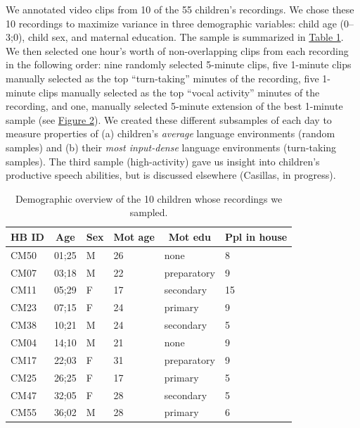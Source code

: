 \documentclass[floatsintext,man]{apa6}
\theoremstyle{definition}
\theoremstyle{definition}
\theoremstyle{definition}
\theoremstyle{remark}
\begin{document}
We annotated video clips from 10 of the 55 children's recordings. We
chose these 10 recordings to maximize variance in three demographic
variables: child age (0--3;0), child sex, and maternal education. The
sample is summarized in \protect\hyperlink{tab1}{Table 1}. We then
selected one hour's worth of non-overlapping clips from each recording
in the following order: nine randomly selected 5-minute clips, five
1-minute clips manually selected as the top \enquote{turn-taking}
minutes of the recording, five 1-minute clips manually selected as the
top \enquote{vocal activity} minutes of the recording, and one, manually
selected 5-minute extension of the best 1-minute sample (see
\protect\hyperlink{fig2}{Figure 2}). We created these different
subsamples of each day to measure properties of (a) children's
\emph{average} language environments (random samples) and (b) their
\emph{most input-dense} language environments (turn-taking samples). The
third sample (high-activity) gave us insight into children's productive
speech abilities, but is discussed elsewhere (Casillas, in progress).

\begin{table}[tbp]
\begin{center}
\begin{threeparttable}
\caption{\label{tab:tab1}Demographic overview of the 10 children whose recordings we sampled.}
\begin{tabular}{llllll}
\toprule
HB ID & \multicolumn{1}{c}{Age} & \multicolumn{1}{c}{Sex} & \multicolumn{1}{c}{Mot age} & \multicolumn{1}{c}{Mot edu} & \multicolumn{1}{c}{Ppl in house}\\
\midrule
CM50 & 01;25 & M & 26 & none & 8\\
CM07 & 03;18 & M & 22 & preparatory & 9\\
CM11 & 05;29 & F & 17 & secondary & 15\\
CM23 & 07;15 & F & 24 & primary & 9\\
CM38 & 10;21 & M & 24 & secondary & 5\\
CM04 & 14;10 & M & 21 & none & 9\\
CM17 & 22;03 & F & 31 & preparatory & 9\\
CM25 & 26;25 & F & 17 & primary & 5\\
CM47 & 32;05 & F & 28 & secondary & 5\\
CM55 & 36;02 & M & 28 & primary & 6\\
\bottomrule
\end{tabular}
\end{threeparttable}
\end{center}
\end{table}
\end{document}
